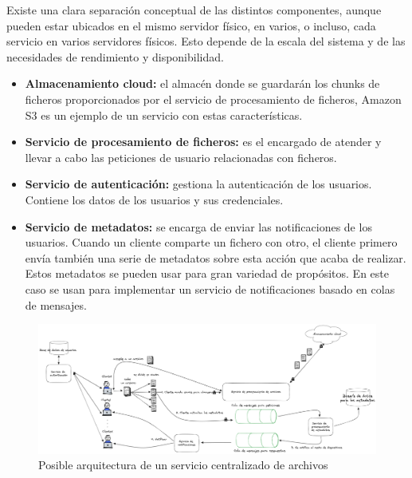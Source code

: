 Existe una clara separación conceptual de las distintos componentes, aunque pueden estar ubicados en
el mismo servidor físico, en varios, o incluso, cada servicio en varios servidores físicos. Esto depende de la escala
del sistema y de las necesidades de rendimiento y disponibilidad.

\begin{itemize}[noitemsep,after=\vspace{-0.4\baselineskip}]
  \item \textbf{Almacenamiento cloud:} el almacén donde se guardarán los chunks de ficheros proporcionados por el servicio
        de procesamiento de ficheros, Amazon S3 es un ejemplo de un servicio con estas características.
        \item\textbf{Servicio de procesamiento de ficheros:} es el encargado de atender y llevar a cabo las peticiones de usuario relacionadas con ficheros.
  \item \textbf{Servicio de autenticación:} gestiona la autenticación de los usuarios. Contiene los datos de los usuarios y sus credenciales.
  \item \textbf{Servicio de metadatos:} se encarga de enviar las notificaciones de los usuarios. Cuando un cliente
        comparte un fichero con otro, el cliente primero envía también una serie de metadatos sobre esta acción que acaba de realizar.
        Estos metadatos se pueden usar para gran variedad de propósitos. En este caso se usan para implementar un servicio de notificaciones basado en colas de mensajes.
\end{itemize}
\begin{figure}
  \centering
  \includegraphics[width=\textwidth]{images/diagramacentral.png}
  \caption{Posible arquitectura de un servicio centralizado de archivos}
  \label{fig:centralizedarch}
\end{figure}

